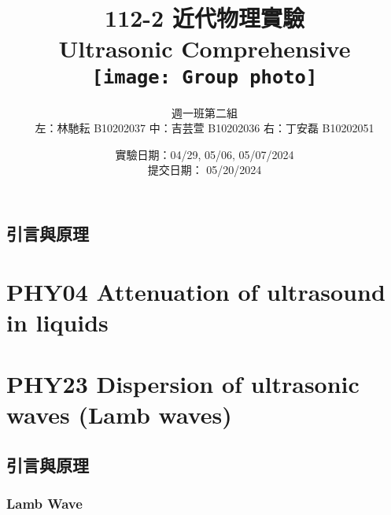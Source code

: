 \documentclass[10pt]{report}
\title{112-2 近代物理實驗\\Ultrasonic Comprehensive\\\vspace{1cm}
\texttt{[image: Group photo]}
}
\author{週一班第二組 \\ 左：林馳耘 B10202037 中：吉芸萱 B10202036 右：丁安磊 B10202051}
\date{實驗日期：04/29, 05/06, 05/07/2024\\提交日期： 05/20/2024}
\begin{document}
\renewcommand{\figurename}{圖}
\renewcommand{\tablename}{表}
\newcommand{\br}[1]{\left(#1\right)}
\renewcommand{\vb}[1]{\boldsymbol{\mathbf{#1}}} %

\maketitle

\tableofcontents

\clearpage

\section{引言與原理}

\chapter{}
\chapter{PHY04 Attenuation of ultrasound in liquids}

\chapter{}
\chapter{}
\chapter{}

\chapter{PHY23 Dispersion of ultrasonic waves (Lamb waves)}

\section{引言與原理}

\subsection{Lamb Wave}
\end{document}
